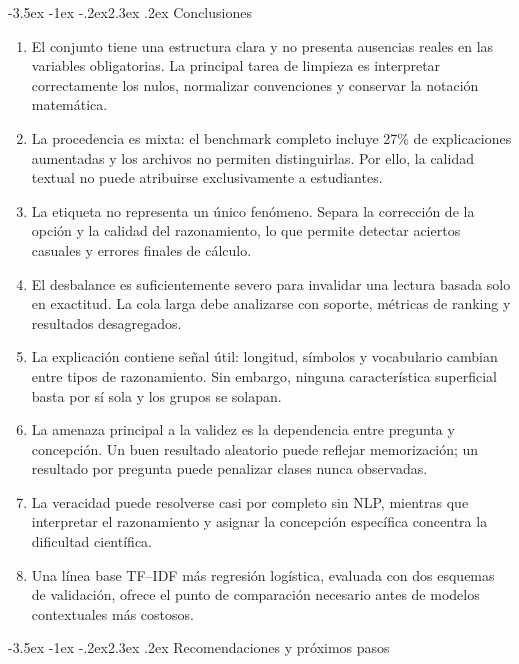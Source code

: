 \documentclass[11pt,oneside,openany]{book}
\makeatletter
\renewcommand\section{\@startsection{section}{1}{\z@}%
  {-3.5ex \@plus -1ex \@minus -.2ex}{2.3ex \@plus .2ex}%
  {\normalfont\Large\sffamily\bfseries\color{AzulMedio}}}
\makeatother
\begin{document}
\section{Conclusiones}

\begin{enumerate}
  \item El conjunto tiene una estructura clara y no presenta ausencias reales
        en las variables obligatorias. La principal tarea de limpieza es
        interpretar correctamente los nulos, normalizar convenciones y
        conservar la notación matemática.
  \item La procedencia es mixta: el benchmark completo incluye 27\% de
        explicaciones aumentadas y los archivos no permiten distinguirlas. Por
        ello, la calidad textual no puede atribuirse exclusivamente a estudiantes.
  \item La etiqueta no representa un único fenómeno. Separa la corrección de la
        opción y la calidad del razonamiento, lo que permite detectar aciertos
        casuales y errores finales de cálculo.
  \item El desbalance es suficientemente severo para invalidar una lectura
        basada solo en exactitud. La cola larga debe analizarse con soporte,
        métricas de ranking y resultados desagregados.
  \item La explicación contiene señal útil: longitud, símbolos y vocabulario
        cambian entre tipos de razonamiento. Sin embargo, ninguna característica
        superficial basta por sí sola y los grupos se solapan.
  \item La amenaza principal a la validez es la dependencia entre pregunta y
        concepción. Un buen resultado aleatorio puede reflejar memorización; un
        resultado por pregunta puede penalizar clases nunca observadas.
  \item La veracidad puede resolverse casi por completo sin NLP, mientras que
        interpretar el razonamiento y asignar la concepción específica concentra
        la dificultad científica.
  \item Una línea base TF--IDF más regresión logística, evaluada con dos esquemas
        de validación, ofrece el punto de comparación necesario antes de modelos
        contextuales más costosos.
\end{enumerate}

\section{Recomendaciones y próximos pasos}
\end{document}
